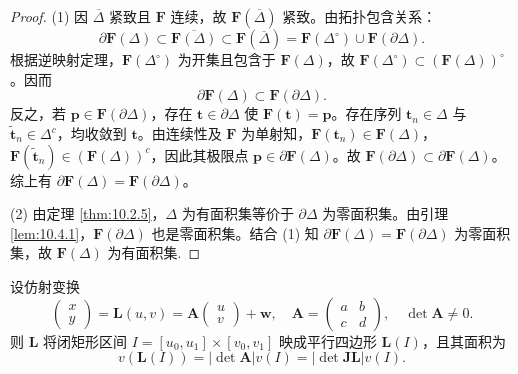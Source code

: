 \begin{proof}
(1) 因 $\overline{\Delta}$ 紧致且 $\boldsymbol{F}$ 连续，故 $\boldsymbol{F}(\overline{\Delta})$ 紧致。由拓扑包含关系：
\[
\partial\boldsymbol{F}(\Delta) \subset \overline{\boldsymbol{F}(\Delta)} \subset \boldsymbol{F}(\overline{\Delta}) = \boldsymbol{F}(\Delta^\circ) \cup \boldsymbol{F}(\partial\Delta).
\]
根据逆映射定理，$\boldsymbol{F}(\Delta^\circ)$ 为开集且包含于 $\boldsymbol{F}(\Delta)$，故 $\boldsymbol{F}(\Delta^\circ) \subset (\boldsymbol{F}(\Delta))^\circ$。因而
\[
\partial\boldsymbol{F}(\Delta) \subset \boldsymbol{F}(\partial\Delta).
\]
反之，若 $\boldsymbol{p} \in \boldsymbol{F}(\partial\Delta)$，存在 $\boldsymbol{t} \in \partial\Delta$ 使 $\boldsymbol{F}(\boldsymbol{t}) = \boldsymbol{p}$。存在序列 $\boldsymbol{t}_n \in \Delta$ 与 $\tilde{\boldsymbol{t}}_n \in \Delta^c$，均收敛到 $\boldsymbol{t}$。由连续性及 $\boldsymbol{F}$ 为单射知，$\boldsymbol{F}(\boldsymbol{t}_n) \in \boldsymbol{F}(\Delta)$，$\boldsymbol{F}(\tilde{\boldsymbol{t}}_n) \in (\boldsymbol{F}(\Delta))^c$，因此其极限点 $\boldsymbol{p} \in \partial\boldsymbol{F}(\Delta)$。故 $\boldsymbol{F}(\partial\Delta) \subset \partial\boldsymbol{F}(\Delta)$。综上有 $\partial\boldsymbol{F}(\Delta) = \boldsymbol{F}(\partial\Delta)$。

(2) 由定理 \ref{thm:10.2.5}，$\Delta$ 为有面积集等价于 $\partial\Delta$ 为零面积集。由引理 \ref{lem:10.4.1}，$\boldsymbol{F}(\partial\Delta)$ 也是零面积集。结合 (1) 知 $\partial\boldsymbol{F}(\Delta) = \boldsymbol{F}(\partial\Delta)$ 为零面积集，故 $\boldsymbol{F}(\Delta)$ 为有面积集.
\end{proof}

\begin{lemma}\label{lem:10.4.3}
设仿射变换
\[
\begin{pmatrix} x \\ y \end{pmatrix} = \boldsymbol{L}(u, v) = \boldsymbol{A} \begin{pmatrix} u \\ v \end{pmatrix} + \boldsymbol{w},\quad \boldsymbol{A} = \begin{pmatrix} a & b \\ c & d \end{pmatrix},\quad \det \boldsymbol{A} \neq 0.
\]
则 $\boldsymbol{L}$ 将闭矩形区间 $I = [u_0, u_1] \times [v_0, v_1]$ 映成平行四边形 $\boldsymbol{L}(I)$，且其面积为
\[
v(\boldsymbol{L}(I)) = |\det \boldsymbol{A}| v(I) = |\det \boldsymbol{J}\boldsymbol{L}| v(I).
\]
\end{lemma}

